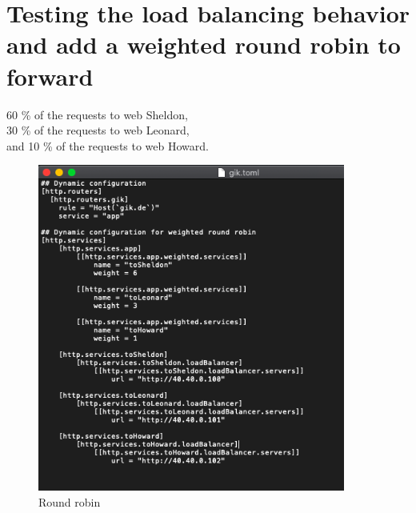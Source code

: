 \section{Testing the load balancing behavior and add a weighted round robin to forward
}
 60 \% of the requests to web Sheldon,
 \\30 \% of the requests to web Leonard,
 \\and 10 \%  of the requests to web Howard.

\begin{figure}[H]
\centering
  \includegraphics[width=0.9\textwidth]{Images/Round-Robin.png}
  \caption{Round robin}
  \label{fig:3.17}
\end{figure}

